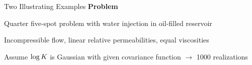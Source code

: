 \def\name{Two Illustrating Examples}

\begin{frame}{\name{}}
    \textbf{Problem}
    \begin{squarelist}
        \item Quarter five-spot problem with water injection in oil-filled reservoir
        \item Incompressible flow, linear relative permeabilities, equal viscosities
        \item Assume $\log K$ is Gaussian with given covariance function $\rightarrow$ 1000 realizations
    \end{squarelist}
\end{frame}

\def\name{Example 1: Smooth Permeability}

